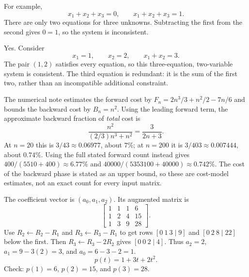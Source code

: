 For example,
\[
 x_1+x_2+x_3=0,\qquad x_1+x_2+x_3=1.
\]
There are only two equations for three unknowns. Subtracting the first
from the second gives $0=1$, so the system is inconsistent.

Yes. Consider
\[
 x_1=1,\qquad x_2=2,\qquad x_1+x_2=3.
\]
The pair $(1,2)$ satisfies every equation, so this three-equation,
two-variable system is consistent. The third equation is redundant: it
is the sum of the first two, rather than an incompatible additional
constraint.

The numerical note estimates the forward cost by
$F_n=2n^3/3+n^2/2-7n/6$ and bounds the backward cost by $B_n=n^2$.
Using the leading forward term, the approximate backward fraction of
\emph{total} cost is
\[
 \frac{n^2}{(2/3)n^3+n^2}=\frac3{2n+3}.
\]
At $n=20$ this is $3/43\approx0.06977$, about $7\%$; at $n=200$
it is $3/403\approx0.007444$, about $0.74\%$.
Using the full stated forward count instead gives
$400/(5510+400)\approx6.77\%$ and
$40000/(5353100+40000)\approx0.742\%$.
The cost of the backward phase is stated as an upper bound, so these are
cost-model estimates, not an exact count for every input matrix.

The coefficient vector is $(a_0,a_1,a_2)$. Its augmented matrix is
\[
\begin{bmatrix}1&1&1&6\\1&2&4&15\\1&3&9&28\end{bmatrix}.
\]
Use $R_2\leftarrow R_2-R_1$ and $R_3\leftarrow R_3-R_1$ to get
rows $[0\ 1\ 3\mid9]$ and $[0\ 2\ 8\mid22]$ below the first.
Then $R_3\leftarrow R_3-2R_2$ gives $[0\ 0\ 2\mid4]$.
Thus $a_2=2$, $a_1=9-3(2)=3$, and $a_0=6-3-2=1$.
\[
 p(t)=1+3t+2t^2.
\]
Check: $p(1)=6$, $p(2)=15$, and $p(3)=28$.

